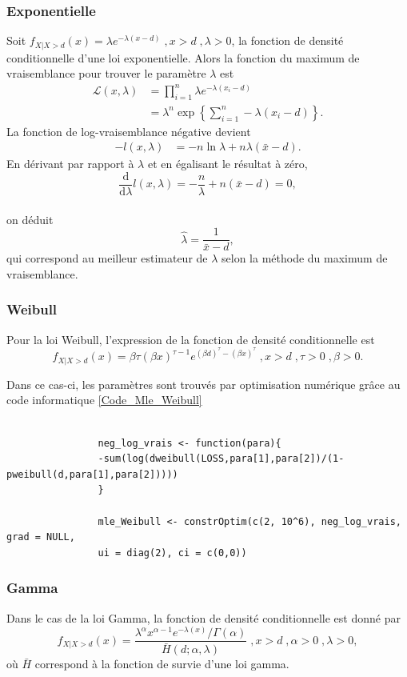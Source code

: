 		\subsubsection{Exponentielle}
			Soit $f_{X|X>d}(x)= \lambda e^{-\lambda(x-d)} \;, x>d\;,\lambda>0$, la fonction de densité conditionnelle d'une loi exponentielle. Alors la fonction du maximum de vraisemblance pour trouver le paramètre $\lambda$ est
			\begin{align*}
				\mathcal{L}(x,\lambda)
				&=\prod_{i=1}^{n} \lambda e^{-\lambda(x_i-d)}\\
				&=\lambda^n \exp\left\lbrace \sum_{i=1}^{n}-\lambda(x_i-d) \right\rbrace.
			\end{align*}
			La fonction de log-vraisemblance négative devient
			\begin{align*}
				-l(x,\lambda)
				&= -n \ln \lambda + n\lambda(\bar{x}-d).		
			\end{align*}
			En dérivant par rapport à $\lambda$ et en égalisant le résultat à zéro, 
			$$	\frac{\textrm{d}}{\textrm{d}\lambda} l(x,\lambda) = -\frac{n}{\lambda}+ n(\bar{x}-d) = 0,$$ \\
			on déduit	$$ \hat{\lambda} = \frac{1}{\bar{x}-d},$$
			qui correspond au meilleur estimateur de $\lambda$ selon la méthode du maximum de vraisemblance.
		\subsubsection{Weibull}
			Pour la loi Weibull, l'expression de la fonction de densité conditionnelle est 
			$$ f_{X|X>d}(x)=\beta\tau(\beta x)^{\tau-1} e^{(\beta d)^\tau - (\beta x)^\tau}\;,x>d\;,\tau>0\;, \beta>0.$$
			
			Dans ce cas-ci, les paramètres sont trouvés par optimisation numérique grâce au code informatique \ref{Code_Mle_Weibull}
			\begin{Code}\label{Code_Mle_Weibull}
				\begin{verbatim}
				
				neg_log_vrais <- function(para){
				-sum(log(dweibull(LOSS,para[1],para[2])/(1-pweibull(d,para[1],para[2]))))
				}
				
				mle_Weibull <- constrOptim(c(2, 10^6), neg_log_vrais, grad = NULL, 
				ui = diag(2), ci = c(0,0))
				\end{verbatim}
			\end{Code}
			
		\subsubsection{Gamma}
		Dans le cas de la loi Gamma, la fonction de densité conditionnelle est donné par 
		$$f_{X|X>d}(x)= \frac{\lambda^\alpha x^{\alpha-1} e^{-\lambda(x)}/\Gamma(\alpha)}{\bar{H}(d;\alpha,\lambda)} \;, x>d\;,\alpha>0 \;,\lambda>0 ,$$ 
		où $\bar{H}$ correspond à la fonction de survie d'une loi gamma.\\
		
